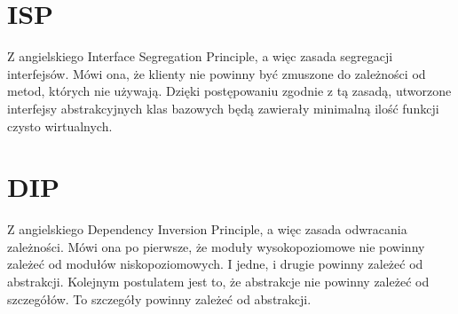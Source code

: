 \section{ISP}
Z angielskiego Interface Segregation Principle, a więc zasada segregacji interfejsów.
Mówi ona, że klienty nie powinny być zmuszone do zależności od metod, których nie używają.\autocite[151]{martin2015zwinne}
Dzięki postępowaniu zgodnie z tą zasadą, utworzone interfejsy abstrakcyjnych klas bazowych będą zawierały minimalną ilość funkcji czysto wirtualnych.

\section{DIP}
Z angielskiego Dependency Inversion Principle, a więc zasada odwracania zależności.
Mówi ona po pierwsze, że moduły wysokopoziomowe nie powinny zależeć od modułów niskopoziomowych. I jedne, i drugie powinny zależeć od abstrakcji.\autocite[141]{martin2015zwinne}
Kolejnym postulatem jest to, że abstrakcje nie powinny zależeć od szczegółów. To szczegóły powinny zależeć od abstrakcji.\autocite[141]{martin2015zwinne}
